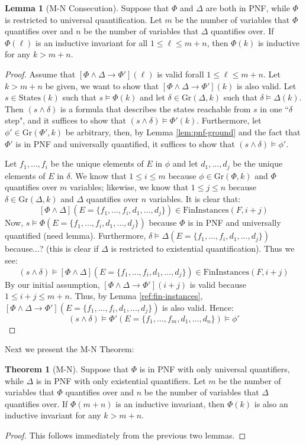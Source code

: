 \documentclass[12pt]{article}
\theoremstyle{definition}
\newtheorem{lemma}{Lemma}
\newtheorem{theorem}{Theorem}
\theoremstyle{remark}
\newcommand{\states}{\text{States}}
\newcommand{\gr}{\text{Gr}}
\newcommand{\fininstances}{\text{FinInstances}}
\begin{document}
\begin{lemma}[M-N Consecution]
  Suppose that $\Phi$ and $\Delta$ are both in PNF, while $\Phi$ is restricted to universal quantification.  Let $m$ be the number of variables that $\Phi$ quantifies over and $n$ be the number of variables that $\Delta$ quantifies over.  If $\Phi(\ell)$ is an inductive invariant for all $1 \leq \ell \leq m+n$, then $\Phi(k)$ is inductive for any $k>m+n$.
\end{lemma}
\begin{proof}
  Assume that $[\Phi\land\Delta \rightarrow \Phi'](\ell)$ is valid forall $1 \leq \ell \leq m+n$.  Let $k>m+n$ be given, we want to show that $[\Phi\land\Delta \rightarrow \Phi'](k)$ is also valid.  Let $s \in \states(k)$ such that $s \models \Phi(k)$ and let $\delta \in \gr(\Delta,k)$ such that $\delta \models \Delta(k)$.  Then $(s \land \delta)$ is a formula that describes the states reachable from $s$ in one ``$\delta$ step", and it suffices to show that $(s \land \delta) \models \Phi'(k)$.  Furthermore, let $\phi' \in \gr(\Phi',k)$ be arbitrary, then, by Lemma \ref{lem:pnf-ground} and the fact that $\Phi'$ is in PNF and universally quantified, it suffices to show that $(s \land \delta) \models \phi'$.

  Let $f_1,...,f_i$ be the unique elements of $E$ in $\phi$ and let $d_1,...,d_j$ be the unique elements of $E$ in $\delta$.  We know that $1 \leq i \leq m$ because $\phi \in \gr(\Phi,k)$ and $\Phi$ quantifies over $m$ variables; likewise, we know that $1 \leq j \leq n$ because $\delta \in \gr(\Delta,k)$ and $\Delta$ quantifies over $n$ variables.  It is clear that:
  $$[\Phi\land\Delta](E=\{f_1,...,f_i,d_1,...,d_j\}) \in \fininstances(F,i+j)$$
  Now, $s \models \Phi(E=\{f_1,...,f_i,d_1,...,d_j\})$ because $\Phi$ is in PNF and universally quantified (need lemma).  Furthermore, $\delta \models \Delta(E=\{f_1,...,f_i,d_1,...,d_j\})$ because...? (this is clear if $\Delta$ is restricted to existential quantification).  Thus we see:
  $$(s \land \delta) \models [\Phi\land\Delta](E=\{f_1,...,f_i,d_1,...,d_j\}) \in \fininstances(F,i+j)$$
  By our initial assumption, $[\Phi\land\Delta \rightarrow \Phi'](i+j)$ is valid because $1 \leq i+j \leq m+n$.  Thus, by Lemma \ref{ref:fin-instances}, $[\Phi\land\Delta \rightarrow \Phi'](E=\{f_1,...,f_i,d_1,...,d_j\})$ is also valid.  Hence:
  $$(s \land \delta) \models \Phi'(E=\{f_1,...,f_m,d_1,...,d_n\}) \models \phi'$$
\end{proof}

Next we present the M-N Theorem:

\begin{theorem}[M-N]
  Suppose that $\Phi$ is in PNF with only universal quantifiers, while $\Delta$ is in PNF with only existential quantifiers.  Let $m$ be the number of variables that $\Phi$ quantifies over and $n$ be the number of variables that $\Delta$ quantifies over.  If $\Phi(m+n)$ is an inductive invariant, then $\Phi(k)$ is also an inductive invariant for any $k>m+n$.
\end{theorem}
\begin{proof}
  This follows immediately from the previous two lemmas.
\end{proof}





\end{document}
